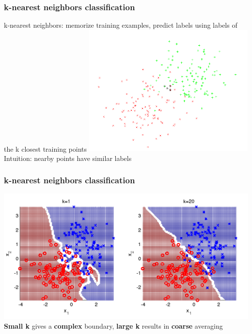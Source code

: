 \begin{frame}
  \frametitle{k-nearest neighbors classification}

  \begin{center}
    k-nearest neighbors: memorize training examples, predict labels using labels of the k closest training points
    \vskip20pt
    \includegraphics[width=0.65\textwidth]{knn_schematic.png}
    \vskip10pt
    Intuition: nearby points have similar labels
  \end{center}

\end{frame}


\begin{frame}
  \frametitle{k-nearest neighbors classification}

  \begin{center}
    \includegraphics[width=\textwidth]{knn_boundary.png}
    \vskip10pt
    \textbf{Small k} gives a \textbf{complex} boundary, \textbf{large
      k} results in \textbf{coarse} averaging
  \end{center}

\end{frame}


